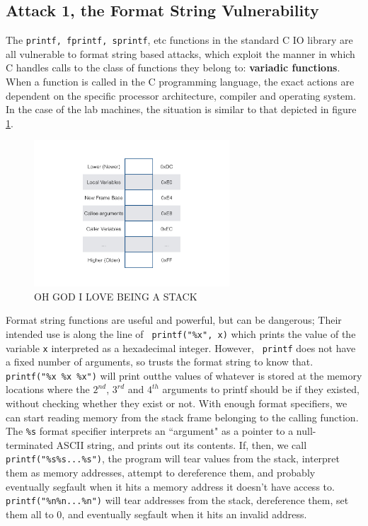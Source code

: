 \subsection{Attack 1, the Format String Vulnerability}

The {\tt printf, fprintf, sprintf}, etc functions in the standard C IO library are all vulnerable to format string based
attacks, which exploit the manner in which C handles calls to the class of functions they belong to: \textbf{variadic
functions}\cite{vfunc}. When a function is called in the C programming language,\cite{call_conv}
the exact actions are dependent on the specific processor architecture, compiler and operating system.
In the case of the lab machines, the situation is similar to that depicted in figure \ref{fig_stack}.

\begin{figure}[ht] \centering \includegraphics[width = 0.65\textwidth]{./images/stack.jpg} \caption{OH GOD I LOVE BEING
A STACK} \label{fig_stack} \end{figure}

Format string functions are useful and powerful, but can be dangerous; Their intended use is along the line of {\tt
printf("\%x", x)} which prints the value of the variable {\tt x} interpreted as a hexadecimal integer. However, {\tt
printf} does not have a fixed number of arguments, so trusts the format string to know that. {\tt printf("\%x \%x \%x")}
will print outthe values of whatever is stored at the memory locations where the $2^{nd}$, $3^{rd}$ and $4^{th}$
arguments to printf should be if they existed, without checking whether they exist or not. With enough format
specifiers, we can start reading memory from the stack frame belonging to the calling function. The {\tt \%s} format
specifier interprets an ``argument" as a pointer to a null-terminated ASCII string, and prints out its contents. If,
then, we call {\tt printf("\%s\%s...\%s")}, the program will tear values from the stack, interpret them as memory
addresses, attempt to dereference them, and probably eventually segfault when it hits a memory address it doesn't have
access to. {\tt printf("\%n\%n...\%n")} will tear addresses from the stack, dereference them, set them all to 0, and
eventually segfault when it hits an invalid address.

